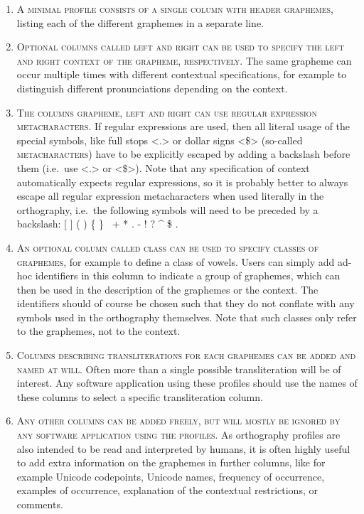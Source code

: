 \begin{enumerate}
	\def\labelenumi{\arabic{enumi}.} \item \textsc{A minimal profile
	consists of a single column with header \textsc{graphemes}}, listing
	each of the different graphemes in a separate line.  \item
	\textsc{Optional columns called \textsc{left} and \textsc{right} can be
	used to specify the left and right context of the grapheme,
	respectively.} The same grapheme can occur multiple times with different
	contextual specifications, for example to distinguish different
	pronunciations depending on the context.  \item \textsc{The columns
	\textsc{grapheme}, \textsc{left} and \textsc{right} can use regular
	expression metacharacters.} If regular expressions are used, then all
	literal usage of the special symbols, like full stops <.> or dollar
	signs <\$> (so-called \textsc{metacharacters}) have to be explicitly
	escaped by adding a backslash before them (i.e.~use <.> or <\$>). Note
	that any specification of context automatically expects regular
	expressions, so it is probably better to always escape all regular
	expression metacharacters when used literally in the orthography,
	i.e.~the following symbols will need to be preceded by a backslash: {[}
	{]} ( ) \{ \} ~+ * . - ! ? \^{} \$ .  \item \textsc{An optional column
	called \textsc{class} can be used to specify classes of graphemes}, for
	example to define a class of vowels. Users can simply add ad-hoc
	identifiers in this column to indicate a group of graphemes, which can
	then be used in the description of the graphemes or the context. The
	identifiers should of course be chosen such that they do not conflate
	with any symbols used in the orthography themselves. Note that such
	classes only refer to the graphemes, not to the context.  \item
	\textsc{Columns describing transliterations for each graphemes can be
	added and named at will}. Often more than a single possible
	transliteration will be of interest. Any software application using
	these profiles should use the names of these columns to select a
	specific transliteration column.  \item \textsc{Any other columns can be
	added freely, but will mostly be ignored by any software application
	using the profiles}. As orthography profiles are also intended to be
	read and interpreted by humans, it is often highly useful to add extra
	information on the graphemes in further columns, like for example
	Unicode codepoints, Unicode names, frequency of occurrence, examples of
	occurrence, explanation of the contextual restrictions, or comments.
\end{enumerate}


